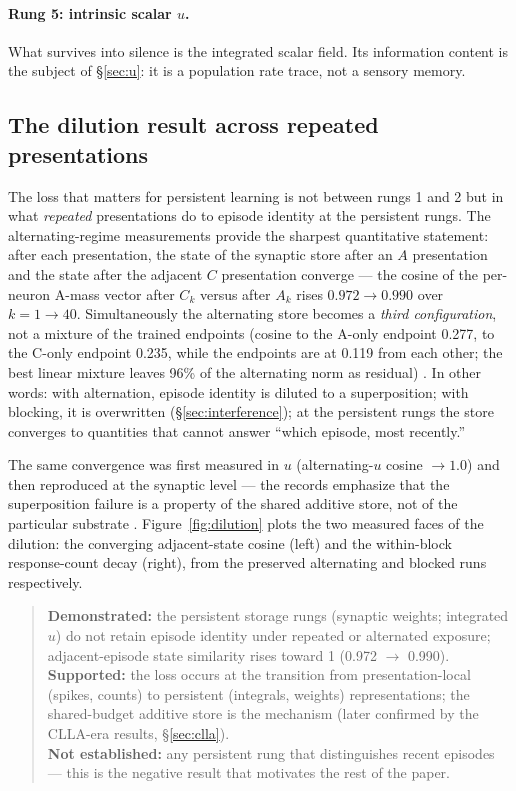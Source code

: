 \paragraph{Rung 5: intrinsic scalar \(u\).}
What survives into silence is the integrated scalar field. Its
information content is the subject of §\ref{sec:u}: it is a population
rate trace, not a sensory memory.

\subsection{The dilution result across repeated presentations}

The loss that matters for persistent learning is not between rungs 1
and 2 but in what \emph{repeated} presentations do to episode identity
at the persistent rungs. The alternating-regime measurements
\cite{synmem} provide the sharpest quantitative statement: after each
presentation, the state of the synaptic store after an \(A\)
presentation and the state after the adjacent \(C\) presentation
converge --- the cosine of the per-neuron A-mass vector after \(C_k\)
versus after \(A_k\) rises \(0.972 \to 0.990\) over
\(k = 1 \to 40\). Simultaneously the alternating store becomes a
\emph{third configuration}, not a mixture of the trained endpoints
(cosine to the A-only endpoint 0.277, to the C-only endpoint 0.235,
while the endpoints are at 0.119 from each other; the best linear
mixture leaves 96\% of the alternating norm as residual)
\cite{synmem}. In other words: with alternation, episode identity is
diluted to a superposition; with blocking, it is overwritten
(§\ref{sec:interference}); at the persistent rungs the store converges
to quantities that cannot answer ``which episode, most recently.''

The same convergence was first measured in \(u\) (alternating-\(u\)
cosine \(\to 1.0\)) and then reproduced at the synaptic level --- the
records emphasize that the superposition failure is a property of the
shared additive store, not of the particular substrate
\cite{synmem}. Figure~\ref{fig:dilution} plots the two measured faces
of the dilution: the converging adjacent-state cosine (left) and the
within-block response-count decay (right), from the preserved
alternating and blocked runs respectively.

\begin{quote}
\textbf{Demonstrated:} the persistent storage rungs (synaptic weights;
integrated \(u\)) do not retain episode identity under repeated or
alternated exposure; adjacent-episode state similarity rises toward
1 (0.972 \(\to\) 0.990).\\[1pt]
\textbf{Supported:} the loss occurs at the transition from
presentation-local (spikes, counts) to persistent (integrals, weights)
representations; the shared-budget additive store is the mechanism
(later confirmed by the CLLA-era results, §\ref{sec:clla}).\\[1pt]
\textbf{Not established:} any persistent rung that distinguishes recent
episodes --- this is the negative result that motivates the rest of the
paper.
\end{quote}

